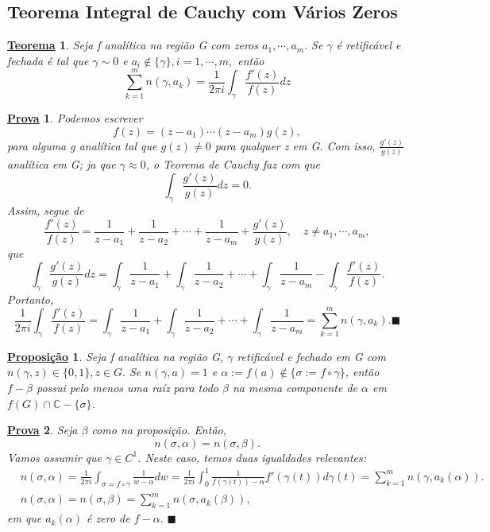 \documentclass{article}
\newtheorem*{theorem*}{\underline{Teorema}}
\newtheorem*{proof*}{\underline{Prova}}
\newtheorem*{prop*}{\underline{Proposi\c c\~ao}}
\renewcommand\qedsymbol{$\blacksquare$}
\begin{document}
 \subsection{Teorema Integral de Cauchy com V\'arios Zeros}
\begin{theorem*}
  Seja f anal\'itica na regi\~ao G com zeros $a_{1}, \cdots, a_{m}.$ Se $\gamma$ \'e retific\'avel e fechada \'e tal que $\gamma\sim0$
  e $a_{i}\not\in \{\gamma\}, i = 1, \cdots, m, $ ent\~ao
  $$
    \sum\limits_{k=1}^{m}n(\gamma, a_{k}) = \frac{1}{2\pi i}\int_{\gamma}^{}\frac{f'(z)}{f(z)}dz
  $$
\end{theorem*}
\begin{proof*}
  Podemos escrever 
  $$
    f(z) = (z-a_{1})\cdots(z-a_{m})g(z),
  $$
para alguma g anal\'itica tal que $g(z)\neq0$ para qualquer z em G. Com isso, $\displaystyle \frac{g'(z)}{g(z)}$ anal\'itica em G;
ja que $\gamma\approx0$, o Teorema de Cauchy faz com que 
  $$
    \int_{\gamma}^{}\frac{g'(z)}{g(z)}dz = 0.
  $$
  Assim, segue de 
  $$
    \frac{f'(z)}{f(z)} = \frac{1}{z-a_{1}} + \frac{1}{z-a_{2}} + \cdots + \frac{1}{z-a_{m}} + \frac{g'(z)}{g(z)},\quad z\neq a_{1}, \cdots, a_{m},
  $$
  que 
  $$
  \int_{\gamma}^{}\frac{g'(z)}{g(z)}dz = \int_{\gamma}^{}\frac{1}{z-a_{1}} + \int_{\gamma}^{}\frac{1}{z-a_{2}} + \cdots + \int_{\gamma}^{}\frac{1}{z-a_{m}} - \int_{\gamma}^{}\frac{f'(z)}{f(z)}.
  $$
  Portanto, 
  $$
  \frac{1}{2\pi i}\int_{\gamma}^{}\frac{f'(z)}{f(z)} = \int_{\gamma}^{}\frac{1}{z-a_{1}} + \int_{\gamma}^{}\frac{1}{z-a_{2}} + \cdots + \int_{\gamma}^{}\frac{1}{z-a_{m}} = \sum\limits_{k=1}^{m}n(\gamma, a_{k}).\text{\qedsymbol}
  $$
\end{proof*}
\begin{prop*}
  Seja f anal\'itica na regi\~ao G, $\gamma$ retific\'avel e fechado em G com $n(\gamma, z)\in \{0, 1\}, z\in{G}.$ Se $n(\gamma, a) = 1$
e $\alpha:= f(a)\not\in \{\sigma:= f\circ{\gamma}\} $, ent\~ao $f-\beta$ possui pelo menos uma ra\'iz para todo $\beta$ na mesma componente
de $\alpha$ em $f(G)\cap{\mathbb{C}-\{\sigma\}}$.
\end{prop*}
\begin{proof*}
  Seja $\beta$ como na proposi\c c\~ao. Ent\~ao,
  $$
    n(\sigma, \alpha) = n(\sigma, \beta).
  $$
  Vamos assumir que $\gamma\in{C^{1}}$. Neste caso, temos duas igualdades relevantes:
  \begin{align*}
    &n(\sigma, \alpha) = \frac{1}{2\pi i}\int_{\sigma=f\circ{\gamma}}^{}\frac{1}{w-\alpha}dw = \frac{1}{2\pi i}\int_{0}^{1}\frac{1}{f(\gamma(t))-\alpha}f'(\gamma(t))d\gamma(t) = \sum\limits_{k=1}^{m}n(\gamma, a_{k}(\alpha)). \\
    &n(\sigma, \alpha) = n(\sigma, \beta) = \sum\limits_{k=1}^{m}n(\sigma, a_{k}(\beta)),
  \end{align*}
  em que $a_{k}(\alpha)$ \'e zero de $f-\alpha.$ \qedsymbol
\end{proof*}
\end{document}
